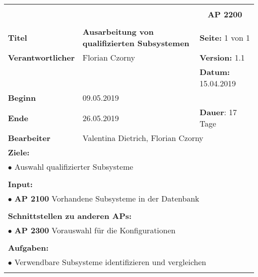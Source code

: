 \clearpage
\begin{table}[!h]
 \begin{center}
  \begin{tabular}{|p{35mm}||p{55mm}|p{50mm}||p{40mm}|}
   \hline
   \multicolumn{3}{|l||}{\textbf{}} & \multicolumn{1}{c|}{}\\
   \multicolumn{3}{|l||}{\textbf{}} & \multicolumn{1}{c|}{\textbf{AP 2200}}\\
   \multicolumn{3}{|l||}{\textbf{}} & \multicolumn{1}{c|}{}\\
   \hline\hline
   \textbf{Titel} & \multicolumn{2}{p{7cm}||}{\textbf{Ausarbeitung von qualifizierten Subsystemen}} & \textbf{Seite:} 1 von 1\\
   \hline
   \textbf{Verantwortlicher} & \multicolumn{2}{l||}{Florian Czorny} & \textbf{Version:} 1.1\\
   \hline
   \multicolumn{3}{|l||}{} & \textbf{Datum:} 15.04.2019\\
   \hline\hline
   \textbf{Beginn} & \multicolumn{2}{l||}{09.05.2019} & \\
   \hline
   \textbf{Ende} & \multicolumn{2}{l||}{26.05.2019} & \textbf{Dauer}: 17 Tage\\
   \hline\hline
   \textbf{Bearbeiter} & \multicolumn{3}{l|}{Valentina Dietrich, Florian Czorny}\\
   \hline\hline
   \multicolumn{4}{|p{150mm}|}{\textbf{Ziele:}}\\
   \multicolumn{4}{|p{150mm}|}{$\bullet$ Auswahl qualifizierter Subsysteme}\\
   \multicolumn{4}{|p{150mm}|}{}\\
   \multicolumn{4}{|p{150mm}|}{\textbf{Input:}}\\
   \multicolumn{4}{|p{150mm}|}{$\bullet$ \textbf{AP 2100} Vorhandene Subsysteme in der Datenbank}\\
   \multicolumn{4}{|p{150mm}|}{}\\
   \multicolumn{4}{|p{150mm}|}{\textbf{Schnittstellen zu anderen APs:}}\\
   \multicolumn{4}{|p{150mm}|}{$\bullet$ \textbf{AP 2300} Vorauswahl für die Konfigurationen}\\
   \multicolumn{4}{|p{150mm}|}{}\\
   \multicolumn{4}{|p{150mm}|}{\textbf{Aufgaben:}}\\
   \multicolumn{4}{|p{150mm}|}{$\bullet$ Verwendbare Subsysteme identifizieren und vergleichen}\\
   \multicolumn{4}{|p{150mm}|}{}\\
   \hline
  \end{tabular}
 \end{center}
\end{table}

